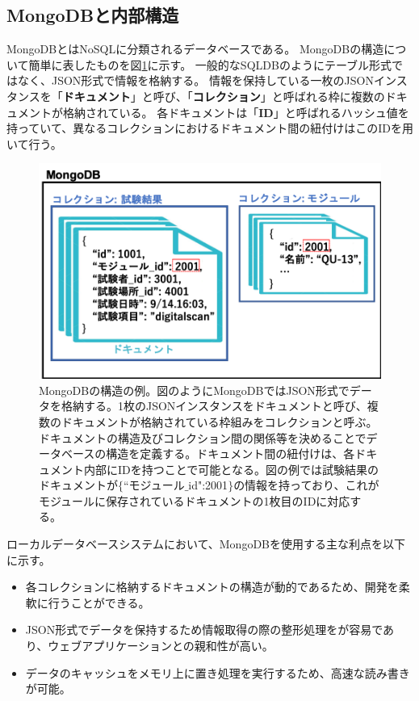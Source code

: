 \subsection{MongoDBと内部構造\cite{4-2}}
MongoDBとはNoSQLに分類されるデータベースである。
MongoDBの構造について簡単に表したものを図\ref{mongodb_schema}に示す。
一般的なSQLDBのようにテーブル形式ではなく、JSON形式で情報を格納する。
情報を保持している一枚のJSONインスタンスを「\textbf{ドキュメント}」と呼び、「\textbf{コレクション}」と呼ばれる枠に複数のドキュメントが格納されている。
各ドキュメントは「\textbf{ID}」と呼ばれるハッシュ値を持っていて、異なるコレクションにおけるドキュメント間の紐付けはこのIDを用いて行う。

\begin{figure}[bpt]\centering
\includegraphics[width=12cm]{./mongodb_schema.png}
\caption[MongoDBの構造の例\cite{4-2}]{MongoDBの構造の例\cite{4-2}。図のようにMongoDBではJSON形式でデータを格納する。1枚のJSONインスタンスをドキュメントと呼び、複数のドキュメントが格納されている枠組みをコレクションと呼ぶ。ドキュメントの構造及びコレクション間の関係等を決めることでデータベースの構造を定義する。ドキュメント間の紐付けは、各ドキュメント内部にIDを持つことで可能となる。図の例では試験結果のドキュメントが$\{$``モジュール$\_$id":2001$\}$の情報を持っており、これがモジュールに保存されているドキュメントの1枚目のIDに対応する。}
\label{mongodb_schema}
\end{figure}


ローカルデータベースシステムにおいて、MongoDBを使用する主な利点を以下に示す。

\begin{itemize}
  \item 各コレクションに格納するドキュメントの構造が動的であるため、開発を柔軟に行うことができる。
  \item JSON形式でデータを保持するため情報取得の際の整形処理をが容易であり、ウェブアプリケーションとの親和性が高い。
  \item データのキャッシュをメモリ上に置き処理を実行するため、高速な読み書きが可能。
\end{itemize}

